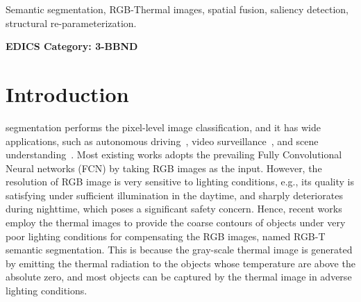 \documentclass[10.5pt,twocolumn,journal,letterpaper]{IEEEtran}
\newcommand{\eg}{e.g.}
\begin{document}
\begin{IEEEkeywords}
Semantic segmentation, RGB-Thermal images, spatial fusion, saliency detection, structural re-parameterization.
\end{IEEEkeywords}


\ifCLASSOPTIONpeerreview
 \begin{center} \bfseries EDICS Category: 3-BBND \end{center}
 \fi

\IEEEpeerreviewmaketitle


\section{Introduction}
\label{sec1:intro}

 segmentation performs the pixel-level image classification, and it has wide applications, such as autonomous driving~\cite{caesar-cvpr2020-nuscenes}, video surveillance~\cite{collins-pami2000-introduction}, and scene understanding~\cite{zhou-ijcv2019-semantic}. Most existing works adopts the prevailing Fully Convolutional Neural networks (FCN) \cite{long-cvpr2015-fcn} by taking RGB images as the input. However, the resolution of RGB image is very sensitive to lighting conditions, \eg, its quality is satisfying under sufficient illumination in the daytime, and sharply deteriorates during nighttime, which poses a significant safety concern. Hence, recent works~\cite{ha-iros2017-mfnet} employ the thermal images to provide the coarse contours of objects under very poor lighting conditions for compensating the RGB images, named RGB-T semantic segmentation. This is because the gray-scale thermal image is generated by emitting the thermal radiation to the objects whose temperature are above the absolute zero, and most objects can be captured by the thermal image in adverse lighting conditions. 
\end{document}

